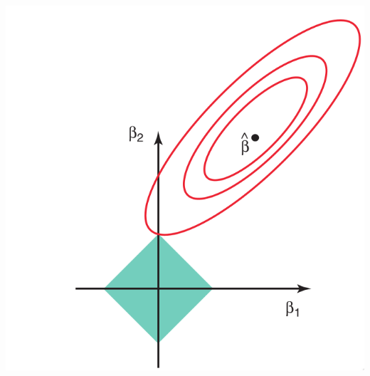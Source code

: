 \documentclass[leqno, 10pt, envcountsect]{beamer}
\numberwithin{equation}{section}
\theoremstyle{definition}
\theoremstyle{example}
\numberwithin{figure}{section}
\numberwithin{table}{section}
\begin{document}
\begin{frame}
\begin{center}
    \includegraphics[scale=0.18]{lasso.png}
  \end{center}
\end{frame}
\end{document}
